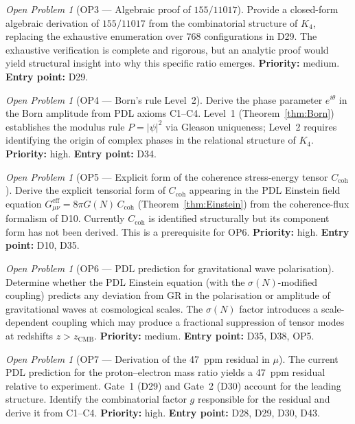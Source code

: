 \documentclass[11pt,a4paper]{article}
\theoremstyle{plain}
\theoremstyle{definition}
\theoremstyle{remark}
\newtheorem{openproblem}[theorem]{Open Problem}
\newcommand{\sigmaN}{\sigma(N)}
\begin{document}
\begin{openproblem}[OP3 --- Algebraic proof of $155/11017$]
\label{op:gate1algebraic}
Provide a closed-form algebraic derivation of $155/11017$ from the combinatorial structure of $K_4$, replacing the exhaustive enumeration over $768$ configurations in D29. The exhaustive verification is complete and rigorous, but an analytic proof would yield structural insight into why this specific ratio emerges. \textbf{Priority:} medium. \textbf{Entry point:} D29.
\end{openproblem}

\begin{openproblem}[OP4 --- Born's rule Level~2]
\label{op:bornlevel2}
Derive the phase parameter $e^{i\theta}$ in the Born amplitude from PDL axioms C1--C4. Level~1 (Theorem~\ref{thm:Born}) establishes the modulus rule $P=|\psi|^2$ via Gleason uniqueness; Level~2 requires identifying the origin of complex phases in the relational structure of $K_4$. \textbf{Priority:} high. \textbf{Entry point:} D34.
\end{openproblem}

\begin{openproblem}[OP5 --- Explicit form of the coherence stress-energy tensor $C_{\mathrm{coh}}$]
\label{op:Ccoh}
Derive the explicit tensorial form of $C_{\mathrm{coh}}$ appearing in the PDL Einstein field equation $G_{\mu\nu}^{\mathrm{eff}}=8\pi G(N)\,C_{\mathrm{coh}}$ (Theorem~\ref{thm:Einstein}) from the coherence-flux formalism of D10. Currently $C_{\mathrm{coh}}$ is identified structurally but its component form has not been derived. This is a prerequisite for OP6. \textbf{Priority:} high. \textbf{Entry point:} D10, D35.
\end{openproblem}

\begin{openproblem}[OP6 --- PDL prediction for gravitational wave polarisation]
\label{op:GW}
Determine whether the PDL Einstein equation (with the $\sigmaN$-modified coupling) predicts any deviation from GR in the polarisation or amplitude of gravitational waves at cosmological scales. The $\sigmaN$ factor introduces a scale-dependent coupling which may produce a fractional suppression of tensor modes at redshifts $z>z_{\mathrm{CMB}}$. \textbf{Priority:} medium. \textbf{Entry point:} D35, D38, OP5.
\end{openproblem}

\begin{openproblem}[OP7 --- Derivation of the 47~ppm residual in $\mu$]
\label{op:residual}
The current PDL prediction for the proton--electron mass ratio yields a 47~ppm residual relative to experiment. Gate~1 (D29) and Gate~2 (D30) account for the leading structure. Identify the combinatorial factor $g$ responsible for the residual and derive it from C1--C4. \textbf{Priority:} high. \textbf{Entry point:} D28, D29, D30, D43.
\end{openproblem}
\end{document}
